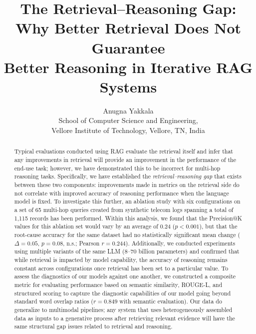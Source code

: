 \documentclass[11pt,a4paper]{article}
\title{The Retrieval--Reasoning Gap: Why Better Retrieval Does Not Guarantee\\Better Reasoning in Iterative RAG Systems}
\author{Anugna Yakkala \\[4pt]
{\normalsize School of Computer Science and Engineering,}\\
{\normalsize Vellore Institute of Technology, Vellore, TN, India}}
\date{}
\begin{document}
\maketitle


\begin{abstract}
Typical evaluations conducted using RAG evaluate the retrieval
itself and infer that any improvements in retrieval will provide
an improvement in the performance of the end-use task; however,
we have demonstrated this to be incorrect for multi-hop reasoning
tasks.
Specifically, we have established the \emph{retrieval--reasoning gap}
that exists between these two components: improvements made in
metrics on the retrieval side do not correlate with improved
accuracy of reasoning performance when the language model is fixed.
To investigate this further, an ablation study with six
configurations on a set of 65 multi-hop queries created from
synthetic telecom logs spanning a total of 1{,}115 records has
been performed.
Within this analysis, we found that the Precision@K values for
this ablation set would vary by an average of 0.24 ($p{<}0.001$),
but that the root-cause accuracy for the same dataset had no
statistically significant mean change ($\Delta{=}0.05$, $p{=}0.08$,
n.s.; Pearson $r{=}0.244$).
Additionally, we conducted experiments using multiple variants of
the same LLM (8--70 billion parameters) and confirmed that while
retrieval is impacted by model capability, the accuracy of
reasoning remains constant across configurations once retrieval
has been set to a particular value.
To assess the diagnostics of our models against one another, we
constructed a composite metric for evaluating performance based on
semantic similarity, ROUGE-L, and structured scoring to capture
the diagnostic capabilities of our model going beyond standard
word overlap ratios ($r{=}0.849$ with semantic evaluation).
Our data do generalize to multimodal pipelines; any system that
uses heterogeneously assembled data as inputs to a generative
process after retrieving relevant evidence will have the same
structural gap issues related to retrieval and reasoning.
\end{abstract}

\end{document}
